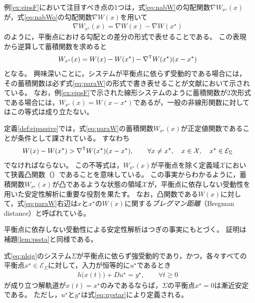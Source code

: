 \documentclass[tombow,dvipdfmx]{corona-a5}
\begin{document}
例\ref{ex:eipsF}において注目すべき点の1つは，式\ref{eq:nabW}の勾配関数$\nabla W_{x^{\star}}(x)$が，式\ref{eq:nabWo}の勾配関数$\nabla W(x)$を用いて
\begin{align*}
\nabla W_{x^{\star}}(x) = \nabla W(x) - \nabla W(x^{\star})
\end{align*}
のように，平衡点における勾配との差分の形式で表せることである。
この表現から逆算して蓄積関数を求めると
\begin{align}\label{eq:paraW}
W_{x^{\star}}(x) = W(x) - W(x^{\star}) - \nabla^{\sf T} W(x^{\star}) (x-x^{\star})
\end{align}
となる。
興味深いことに，システムが平衡点に依らず受動的である場合には，その蓄積関数は必ず式\ref{eq:paraW}の形式で書き表せることが文献\cite{simpson2019equilibrium}において示されている。
なお，例\ref{ex:eipsF}で示された線形システムのように蓄積関数が2次形式である場合には，$W_{x^{\star}}(x)=W(x-x^{\star})$であるが，一般の非線形関数に対してはこの等式は成り立たない。

定義\ref{def:eipassive}では，式\ref{eq:paraW}の蓄積関数$W_{x^{\star}}(x)$が正定値関数であることが条件として課されている。
すなわち
\begin{align*}
W(x) - W(x^{\star})  > \nabla^{\sf T} W(x^{\star}) (x-x^{\star})
,\qquad
\forall x\neq x^{\star},
 \quad
x \in \mathcal{X}
,\quad
x^{\star} \in \mathcal{E}_{\Sigma}
\end{align*}
でなければならない。
この不等式は，$W_{x^{\star}}(x)$が平衡点を除く定義域$\mathcal{X}$において狭義凸関数（）であることを意味している。
この事実からわかるように，蓄積関数$W_{x^{\star}}(x)$が凸であるような状態の領域$\mathcal{X}$が，平衡点に依存しない受動性を用いた安定性解析に重要な役割を果たす。
なお，凸関数である$W(x)$に対して，式\ref{eq:paraW}右辺は$x$と$x^{\star}$の$W(x)$に関する\emph{ブレグマン距離}（Bregman distance）と呼ばれている。


平衡点に依存しない受動性による安定性解析はつぎの事実にもとづく。
証明は補題\ref{lem:pssta}と同様である。

\begin{補題}\label{lem:eipssta}
式\ref{eq:nlsig}のシステム$\Sigma$が平衡点に依らず強受動的であり，かつ，各々すべての平衡点$x^{\star} \in \mathcal{E}_{\Sigma}$に対して，入力が恒等的に$u^{\star}$であるとき
\begin{align}\label{eq:eizeroso}
h\bigl(
x(t)
\bigr) + D u^{\star}= y^{\star},\qquad
\forall t\geq 0
\end{align}
が成り立つ解軌道が$x(t)=x^{\star}$のみであるならば，$\Sigma$の平衡点$x^{\star}=0$は漸近安定である。
ただし，$u^{\star}$と$y^{\star}$は式\ref{eq:uystar}により定義される。
\end{補題}
\end{document}
